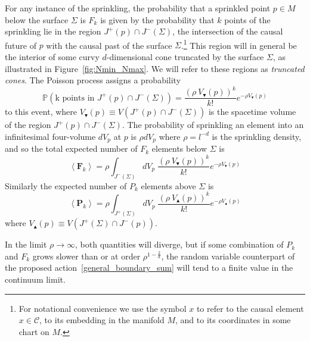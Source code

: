 \documentclass[12pt]{article}
\newcommand{\be}{\begin{equation}}
\newcommand{\ee}{\end{equation}}
\newcommand{\F}[1]{F_{#1}}
\renewcommand{\P}[1]{P_{#1}}
\newcommand{\BF}[1]{\mathbf{F}_{#1}}
\newcommand{\BP}[1]{\mathbf{P}_{#1}}
\begin{document}
For any instance of the sprinkling, the probability that a sprinkled point $p\in M$ below the surface $\Sigma$ is $F_k$ is given by the probability that $k$ points of the sprinkling lie in the region $J^{+} (p)\cap J^{-} (\Sigma)$, the intersection of the causal future of $p$ with the causal past of the surface $\Sigma$.\footnote{For notational convenience we use the symbol $x$ to refer to the causal element $x\in\mathcal C$, to its embedding in the manifold $M$, and to its coordinates in some chart on $M$.} This region will in general be the interior of some curvy $d$-dimensional cone truncated by the surface $\Sigma$, as illustrated in Figure~\ref{fig:Nmin_Nmax}. We will refer to these regions as \emph{truncated cones}. The Poisson process assigns a probability
\be\label{Poisson}
\mathbb P\left (\text{k points in }J^{+} (p)\cap J^{-} (\Sigma)\right)=\frac{\left (\rho\: V_\blacktriangledown (p)\right)^k}{k!}e^{-\rho V_\blacktriangledown (p)}
\ee
to this event, where $V_\blacktriangledown (p)\equiv V (J^{+} (p)\cap J^{-} (\Sigma))$ is the spacetime volume of the region $J^{+} (p)\cap J^{-} (\Sigma)$. The probability of sprinkling an element into an infinitesimal four-volume $dV_p$ at $p$ is $\rho dV_p$ where $\rho=l^{-d}$ is the sprinkling density, and so the total expected number of $\F{k}$ elements below $\Sigma$ is
\be\label{eq:nmax}
\left\langle \BF{k}\right\rangle =\rho\int_{J^{-} (\Sigma)}dV_p\; \frac{\left (\rho\: V_\blacktriangledown (p)\right)^k}{k!}e^{-\rho V_\blacktriangledown (p)}
\ee
Similarly the expected number of $\P{k}$ elements above $\Sigma$ is
\be\label{eq:nmin}
\left\langle \BP{k}\right\rangle =\rho\int_{J^{+} (\Sigma)}dV_p\; \frac{\left (\rho\: V_\blacktriangle (p)\right)^k}{k!}e^{-\rho V_\blacktriangle (p)}
\ee
where $V_\blacktriangle (p)\equiv V (J^{+} (\Sigma)\cap J^{-} (p))$.

In the limit $\rho\rightarrow\infty$, both quantities will diverge, but if some combination of $\P{k}$ and $\F{k}$ grows slower than or at order $\rho^{1-\frac2d}$, the random variable counterpart of the proposed action~\eqref{general_boundary_sum} will tend to a finite value in the continuum limit.
\end{document}
